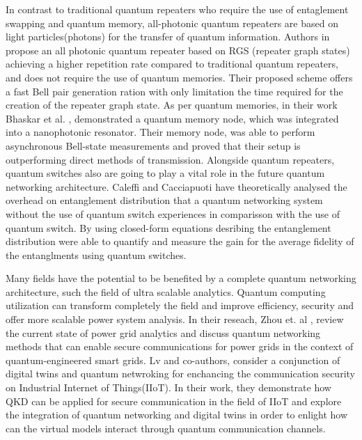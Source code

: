 \documentclass[12pt,a4paper] {report}
\begin{document}
		In contrast to traditional quantum repeaters who require the use of entaglement swapping and quantum memory, all-photonic quantum repeaters
		are based on light particles(photons) for the transfer of quantum information.
		Authors in \cite{repeater1} propose an all photonic quantum repeater 
		based on RGS (repeater graph states) achieving a higher repetition rate compared to traditional quantum repeaters, and does not require 
		the use of quantum memories. Their proposed scheme offers a fast Bell pair generation ration with only
		limitation the time required for the creation of the repeater graph state. 
		As per quantum memories, in their work Bhaskar et al. \cite{memories}, demonstrated a quantum memory node, which
		was integrated into a nanophotonic resonator. Their memory node, was able to perform asynchronous Bell-state measurements
		and proved that their setup is outperforming direct methods of transmission. Alongside quantum repeaters, quantum switches also
		are going to play a vital role in the future quantum networking architecture. Caleffi and Cacciapuoti \cite{quantum-switch1}
		have theoretically analysed the overhead on entanglement distribution that a quantum networking system 
		without the use of quantum switch experiences in comparisson with the use of quantum switch. By using closed-form equations
		desribing the entanglement distribution were able to quantify and measure the gain for the average fidelity of the entanglments
		using quantum switches.
	
				
		Many fields have the potential to be benefited by a complete quantum networking architecture, 
		such the field of ultra scalable analytics. Quantum computing utilization can transform completely
		the field and improve efficiency, security and offer more scalable power system analysis.
		In their reseach, Zhou et. al \cite{powergrid}, review the current state of power grid analytics 
		and discuss quantum networking methods that can enable secure communications for power grids 
		in the context of quantum-engineered smart grids.
		Lv and co-authors\cite{digital-twins}, consider a conjunction of digital twins and quantum netwroking for enchancing the
		communication security on Industrial Internet of Things(IIoT). In their work, they demonstrate how QKD can be applied
		for secure communication in the field of IIoT and explore the integration of quantum networking and digital twins in order
		to enlight how can the virtual models interact through quantum communication channels.
\end{document}
